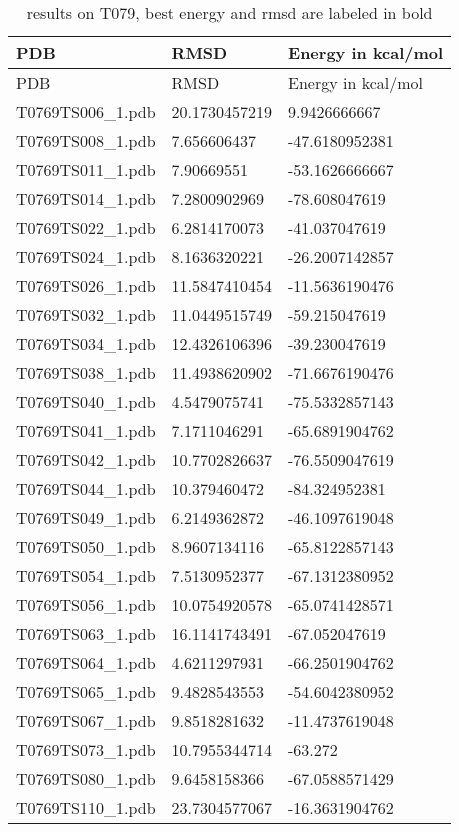 \begin{longtable}{lll}
\caption{results on T079, best energy and rmsd are labeled in bold}
\endfirsthead PDB & RMSD & Energy in kcal/mol\\\hline
\endhead PDB & RMSD & Energy in kcal/mol\\\hline
T0769TS006\_1.pdb & 20.1730457219 & 9.9426666667\\
T0769TS008\_1.pdb & 7.656606437 & -47.6180952381\\
T0769TS011\_1.pdb & 7.90669551 & -53.1626666667\\
T0769TS014\_1.pdb & 7.2800902969 & -78.608047619\\
T0769TS022\_1.pdb & 6.2814170073 & -41.037047619\\
T0769TS024\_1.pdb & 8.1636320221 & -26.2007142857\\
T0769TS026\_1.pdb & 11.5847410454 & -11.5636190476\\
T0769TS032\_1.pdb & 11.0449515749 & -59.215047619\\
T0769TS034\_1.pdb & 12.4326106396 & -39.230047619\\
T0769TS038\_1.pdb & 11.4938620902 & -71.6676190476\\
T0769TS040\_1.pdb & 4.5479075741 & -75.5332857143\\
T0769TS041\_1.pdb & 7.1711046291 & -65.6891904762\\
T0769TS042\_1.pdb & 10.7702826637 & -76.5509047619\\
T0769TS044\_1.pdb & 10.379460472 & -84.324952381\\
T0769TS049\_1.pdb & 6.2149362872 & -46.1097619048\\
T0769TS050\_1.pdb & 8.9607134116 & -65.8122857143\\
T0769TS054\_1.pdb & 7.5130952377 & -67.1312380952\\
T0769TS056\_1.pdb & 10.0754920578 & -65.0741428571\\
T0769TS063\_1.pdb & 16.1141743491 & -67.052047619\\
T0769TS064\_1.pdb & 4.6211297931 & -66.2501904762\\
T0769TS065\_1.pdb & 9.4828543553 & -54.6042380952\\
T0769TS067\_1.pdb & 9.8518281632 & -11.4737619048\\
T0769TS073\_1.pdb & 10.7955344714 & -63.272\\
T0769TS080\_1.pdb & 9.6458158366 & -67.0588571429\\
T0769TS110\_1.pdb & 23.7304577067 & -16.3631904762\\

\end{longtable}
